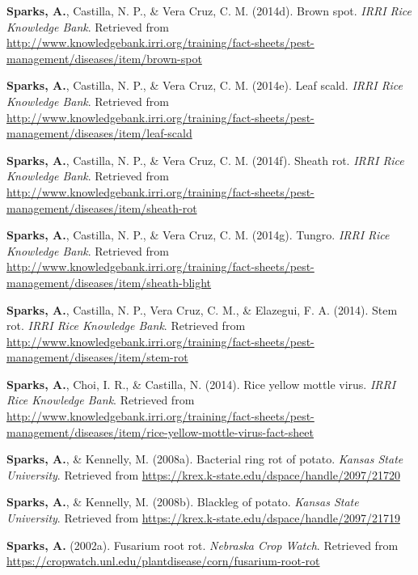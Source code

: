 \documentclass[11pt, a4paper]{awesome-cv}
\begin{document}
\leavevmode\hypertarget{ref-Sparks2014a}{}%
\textbf{Sparks, A.}, Castilla, N. P., \& Vera Cruz, C. M. (2014d). Brown
spot. \emph{{IRRI} Rice Knowledge Bank}. Retrieved from
\url{http://www.knowledgebank.irri.org/training/fact-sheets/pest-management/diseases/item/brown-spot}

\leavevmode\hypertarget{ref-Sparks2014e}{}%
\textbf{Sparks, A.}, Castilla, N. P., \& Vera Cruz, C. M. (2014e). Leaf
scald. \emph{{IRRI} Rice Knowledge Bank}. Retrieved from
\url{http://www.knowledgebank.irri.org/training/fact-sheets/pest-management/diseases/item/leaf-scald}

\leavevmode\hypertarget{ref-Sparks2014g}{}%
\textbf{Sparks, A.}, Castilla, N. P., \& Vera Cruz, C. M. (2014f).
Sheath rot. \emph{{IRRI} Rice Knowledge Bank}. Retrieved from
\url{http://www.knowledgebank.irri.org/training/fact-sheets/pest-management/diseases/item/sheath-rot}

\leavevmode\hypertarget{ref-Sparks2014d}{}%
\textbf{Sparks, A.}, Castilla, N. P., \& Vera Cruz, C. M. (2014g).
Tungro. \emph{{IRRI} Rice Knowledge Bank}. Retrieved from
\url{http://www.knowledgebank.irri.org/training/fact-sheets/pest-management/diseases/item/sheath-blight}

\leavevmode\hypertarget{ref-Sparks2014h}{}%
\textbf{Sparks, A.}, Castilla, N. P., Vera Cruz, C. M., \& Elazegui, F.
A. (2014). Stem rot. \emph{{IRRI} Rice Knowledge Bank}. Retrieved from
\url{http://www.knowledgebank.irri.org/training/fact-sheets/pest-management/diseases/item/stem-rot}

\leavevmode\hypertarget{ref-Sparks2014i}{}%
\textbf{Sparks, A.}, Choi, I. R., \& Castilla, N. (2014). Rice yellow
mottle virus. \emph{{IRRI} Rice Knowledge Bank}. Retrieved from
\url{http://www.knowledgebank.irri.org/training/fact-sheets/pest-management/diseases/item/rice-yellow-mottle-virus-fact-sheet}

\leavevmode\hypertarget{ref-Sparks2008a}{}%
\textbf{Sparks, A.}, \& Kennelly, M. (2008a). Bacterial ring rot of
potato. \emph{Kansas State University}. Retrieved from
\url{https://krex.k-state.edu/dspace/handle/2097/21720}

\leavevmode\hypertarget{ref-Sparks2008b}{}%
\textbf{Sparks, A.}, \& Kennelly, M. (2008b). Blackleg of potato.
\emph{Kansas State University}. Retrieved from
\url{https://krex.k-state.edu/dspace/handle/2097/21719}

\leavevmode\hypertarget{ref-Sparks2002b}{}%
\textbf{Sparks, A.} (2002a). Fusarium root rot. \emph{Nebraska Crop
Watch}. Retrieved from
\url{https://cropwatch.unl.edu/plantdisease/corn/fusarium-root-rot}
\end{document}
